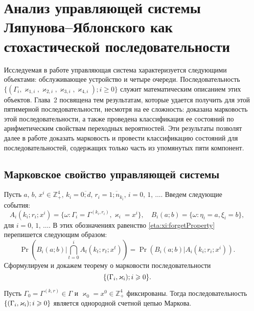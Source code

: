\chapter{Анализ управляющей системы Ляпунова--Яблонского как стохастической последовательности}						%

Исследуемая в работе управляющая система характеризуется следующими объектами:  обслуживающее устройство и четыре очереди. Последовательность 
 $\{(\Gamma_i,  \varkappa_{1, i},  \varkappa_{2, i},  \varkappa_{3, i},   \varkappa_{4, i}); i \geqslant 0\}$ служит математическим описанием этих объектов. Глава~2 посвящена тем результатам,  которые удается получить для этой пятимерной последовательности,  несмотря на ее сложность: доказана марковость этой последовательности,  а также проведена классификация ее состояний по арифметическим свойствам переходных вероятностей. Эти результаты позволят далее в работе доказать марковость и провести классификацию состояний для последовательностей,  содержащих только часть из упомянутых пяти компонент.

\section[Марковское свойство управляющей системы]%
{Марковское свойство управляющей системы}
Пусть $a$,  $b$,  $x^i \in \mathbb{Z}_+^4$,  $k_i=\overline{0;d}$,  $r_i=\overline{1;n_{k_i}}$,  $i=0$,  $1$,  $\ldots$. Введем следующие события:
\begin{equation}
A_i(k_i;r_i;x^i) = \{\omega\colon\Gamma_i=\Gamma^{(k_i, r_i)},  \varkappa_i=x^i\},  \quad  B_i(a;b) = \{\omega\colon\eta_i=a,  \xi_i=b\}, 
\label{A:definition}
\end{equation}
 для $i=0$,  $1$,  $\ldots$.
В этих обозначениях равенство \eqref{eta:xi:forgetProperty}  перепишется следующим образом:
\begin{equation}
\Pr (B_i(a;b) | \bigcap_{t=0}^{i} A_t(k_t;r_t;x^t)) = \Pr (B_i(a;b) |  A_i(k_i;r_i;x^i)).
\label{new:notation:eta:xi:forget}
\end{equation}
Сформулируем и докажем теорему о марковости последовательности 
$$\Mark.$$
\begin{theorem}
Пусть $\Gamma_0=\Gamma^{(k, r)}\in \Gamma$ и $\varkappa_0=x^0\in \mathbb{Z}_+^4$ фиксированы. Тогда последовательность $\Mark$ является однородной счетной цепью Маркова. 
\end{theorem}


